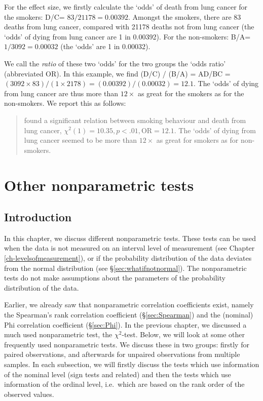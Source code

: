 \documentclass[
]{book}
\begin{document}
For the effect size, we firstly calculate the `odds' of death from
lung cancer for the smokers: D/C= \(83/21178 =0.00392\). Amongst the smokers,
there are 83 deaths from lung cancer, compared with 21178
deaths not from lung cancer (the `odds' of dying from
lung cancer are 1 in 0.00392). For the non-smokers:
B/A=\(1/3092 =0.00032\) (the `odds' are 1 in 0.00032).

We call the \emph{ratio} of these two `odds' for the two groups the
`odds ratio' (abbreviated OR). In this example, we find (D/C) / (B/A) =
AD/BC =
\((3092 \times 83) / (1 \times 2178) = (0.00392)/(0.00032) = 12.1\). The
`odds' of dying from lung cancer are thus more than \(12\times\)
as great for the smokers as for the non-smokers. We report this as follows:

\begin{quote}
\citet{DollHill1956} found a significant relation between
smoking behaviour and death from lung cancer,
\(\chi^2(1)=10.35, p<.01, \textrm{OR}=12.1\). The `odds' of dying from
lung cancer seemed to be more than \(12\times\) as great for smokers as for
non-smokers.
\end{quote}

\hypertarget{ch-other-nonpar-tests}{%
\chapter{Other nonparametric tests}\label{ch-other-nonpar-tests}}

\hypertarget{sec:h17introduction}{%
\section{Introduction}\label{sec:h17introduction}}

In this chapter, we discuss different nonparametric tests.
These tests can be used when the data is not
measured on an interval level of measurement (see Chapter
\ref{ch-levelsofmeasurement}), or if the probability distribution of the
data deviates from the normal distribution (see
§\ref{sec:whatifnotnormal}). The nonparametric tests do not make
assumptions about the parameters of the probability distribution of the data.

Earlier, we already saw that nonparametric correlation coefficients exist,
namely the Spearman's rank correlation coefficient (§\ref{sec:Spearman})
and the (nominal) Phi correlation coefficient
(§\ref{sec:Phi}). In the previous chapter, we discussed
a much used nonparametric test, the \(\chi^2\)-test. Below, we will look at some other
frequently used nonparametric tests. We discuss these in two groups:
firstly for paired observations, and afterwards for unpaired observations from
multiple samples. In each subsection, we will firstly discuss the tests
which use information of the nominal level (sign tests and related) and
then the tests which use information of the ordinal level, i.e.~which are based on the
rank order of the observed values.
\end{document}

